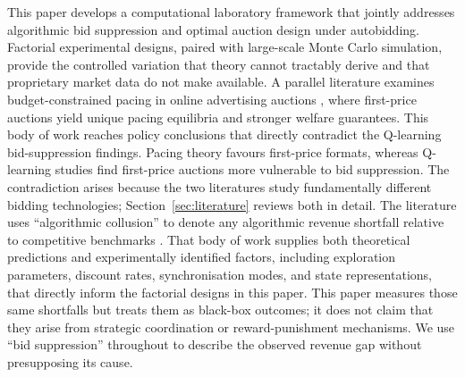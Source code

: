 This paper develops a computational laboratory framework that jointly addresses algorithmic bid suppression and optimal auction design under autobidding. Factorial experimental designs, paired with large-scale Monte Carlo simulation, provide the controlled variation that theory cannot tractably derive and that proprietary market data do not make available. A parallel literature examines budget-constrained pacing in online advertising auctions \citep{Aggarwal2019, Balseiro2019Learning, Conitzer2022FPPE, Gaitonde2023}, where first-price auctions yield unique pacing equilibria and stronger welfare guarantees. This body of work reaches policy conclusions that directly contradict the Q-learning bid-suppression findings. Pacing theory favours first-price formats, whereas Q-learning studies find first-price auctions more vulnerable to bid suppression. The contradiction arises because the two literatures study fundamentally different bidding technologies; Section~\ref{sec:literature} reviews both in detail. The literature uses ``algorithmic collusion'' to denote any algorithmic revenue shortfall relative to competitive benchmarks \citep{Calvano2020, BanchioSkrzypacz2022}. That body of work supplies both theoretical predictions and experimentally identified factors, including exploration parameters, discount rates, synchronisation modes, and state representations, that directly inform the factorial designs in this paper. This paper measures those same shortfalls but treats them as black-box outcomes; it does not claim that they arise from strategic coordination or reward-punishment mechanisms. We use ``bid suppression'' throughout to describe the observed revenue gap without presupposing its cause.

